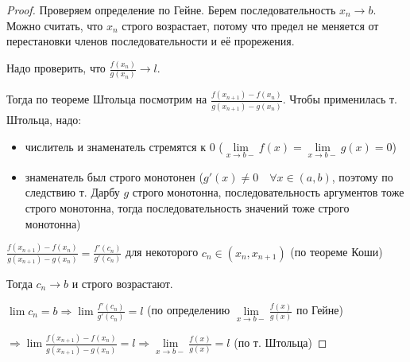 \begin{proof}
    Проверяем определение по Гейне. Берем последовательность $x_n \longrightarrow b$. Можно считать, что $x_n$ строго возрастает, 
    потому что предел не меняется от перестановки членов последовательности и её прорежения.

    Надо проверить, что $\frac{f(x_n)}{g(x_n)} \longrightarrow l$.

    Тогда по теореме Штольца посмотрим на $\frac{f(x_{n+1}) - f(x_n)}{g(x_{n+1}) - g(x_n)}$. Чтобы применилась т. Штольца, надо:
    \begin{itemize}
        \item числитель и знаменатель стремятся к 0 ($\lim\limits_{x \rightarrow b-} f(x) = \lim\limits_{x \rightarrow b-} g(x) = 0$)
        \item знаменатель был строго монотонен ($g'(x) \neq 0 \quad \forall x \in (a, b)$, 
        поэтому по следствию т. Дарбу $g$ строго монотонна, последовательность аргументов тоже строго монотонна, тогда последовательность значений тоже строго монотонна)
    \end{itemize}

    $\frac{f(x_{n+1}) - f(x_n)}{g(x_{n+1}) - g(x_n)} = \frac{f'(c_n)}{g'(c_n)}$ для некоторого $c_n \in (x_n, x_{n+1})$ (по теореме Коши)
    

    Тогда $c_n \longrightarrow b$  и строго возрастают.

    $\lim c_n = b \Longrightarrow \lim \frac{f'(c_n)}{g'(c_n)} = l$ (по определению $\lim\limits_{x \rightarrow b-}\frac{f(x)}{g(x)}$ по Гейне)

    $\Longrightarrow \lim \frac{f(x_{n+1}) - f(x_n)}{g(x_{n+1}) - g(x_n)} = l \Longrightarrow \lim\limits_{x \rightarrow b-}\frac{f(x)}{g(x)} = l$ (по т. Штольца)

\end{proof}

